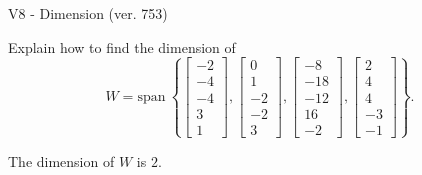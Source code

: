 \begin{exercise}
  \begin{exerciseTitle}V8 - Dimension (ver. 753)\end{exerciseTitle}
  \begin{exerciseStatement}
    Explain how to find the dimension of 
\[W=\mathrm{span}\ \left\{\left[\begin{array}{r}
-2 \\
-4 \\
-4 \\
3 \\
1
\end{array}\right] , \left[\begin{array}{r}
0 \\
1 \\
-2 \\
-2 \\
3
\end{array}\right] , \left[\begin{array}{r}
-8 \\
-18 \\
-12 \\
16 \\
-2
\end{array}\right] , \left[\begin{array}{r}
2 \\
4 \\
4 \\
-3 \\
-1
\end{array}\right]\right\}.\]



  \end{exerciseStatement}
  \begin{exerciseAnswer}
   The dimension of \(W\) is  \(2\).
  


  \end{exerciseAnswer}
\end{exercise}